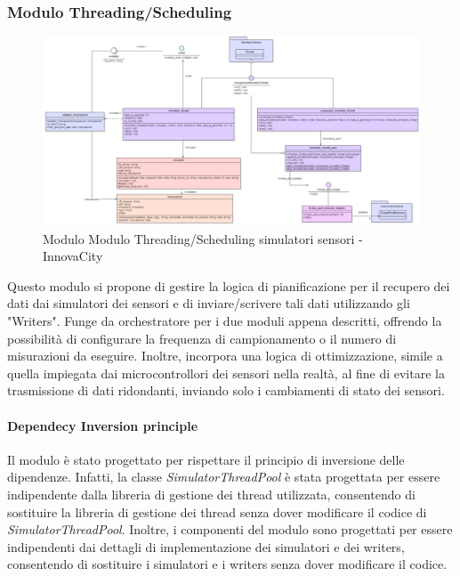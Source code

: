 \subsubsection{Modulo Threading/Scheduling}
\begin{figure}[H]
    \centering
    \includegraphics[width=1.1\textwidth]{../Images/SpecificaTecnica/simulatorThread.PNG}
    \caption{Modulo Modulo Threading/Scheduling simulatori sensori - InnovaCity}
    \label{fig: Modulo_simulatori_sensori_thread}
\end{figure}
Questo modulo si propone di gestire la logica di pianificazione per il recupero dei dati dai simulatori dei sensori e di inviare/scrivere tali dati utilizzando gli "Writers". Funge da orchestratore per i due moduli appena descritti, offrendo la possibilità di configurare la frequenza di campionamento o il numero di misurazioni da eseguire. Inoltre, incorpora una logica di ottimizzazione, simile a quella impiegata dai microcontrollori dei sensori nella realtà, al fine di evitare la trasmissione di dati ridondanti, inviando solo i cambiamenti di stato dei sensori.

\paragraph*{Dependecy Inversion principle}
Il modulo è stato progettato per rispettare il principio di inversione delle dipendenze. Infatti, la classe \textit{SimulatorThreadPool} è stata progettata per essere indipendente dalla libreria di gestione dei thread utilizzata, consentendo di sostituire la libreria di gestione dei thread senza dover modificare il codice di \textit{SimulatorThreadPool}.
Inoltre, i componenti del modulo sono progettati per essere indipendenti dai dettagli di implementazione dei simulatori e dei writers, consentendo di sostituire i simulatori e i writers senza dover modificare il codice.

